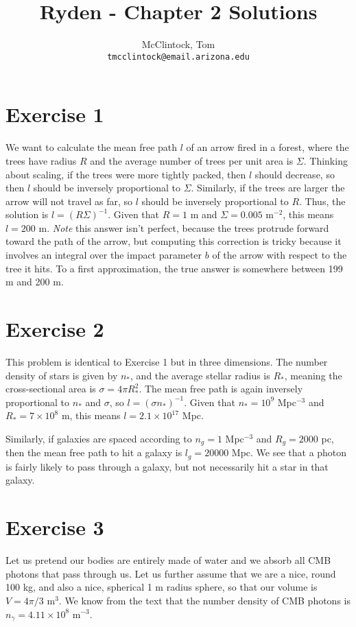 \documentclass[12pt,a4paper]{article}
\author{
  McClintock, Tom\\
  \texttt{tmcclintock@email.arizona.edu}
}
\title{Ryden - Chapter 2 Solutions}
\newcommand\TM[1]{\todo[color=green!40, inline, size=\small]{TM: #1}}
\begin{document}
\maketitle

\section{Exercise 1}
\label{sec:ex1}

We want to calculate the mean free path $l$ of an arrow fired in a forest, where the trees have radius $R$ and the average number of trees per unit area is $\Sigma$. Thinking about scaling, if the trees were more tightly packed, then $l$ should decrease, so then $l$ should be inversely proportional to $\Sigma$. Similarly, if the trees are larger the arrow will not travel as far, so $l$ should be inversely proportional to $R$. Thus, the solution is $l=(R\Sigma)^{-1}$. Given that $R=1$ m and $\Sigma = 0.005$ m$^{-2}$, this means $l=200$ m. {\it Note} this answer isn't perfect, because the trees protrude forward toward the path of the arrow, but computing this correction is tricky because it involves an integral over the impact parameter $b$ of the arrow with respect to the tree it hits. To a first approximation, the true answer is somewhere between 199 m and 200 m.

\section{Exercise 2}
\label{sec:ex2}

This problem is identical to Exercise 1 but in three dimensions. The number density of stars is given by $n_*$, and the average stellar radius is $R_*$, meaning the cross-sectional area is $\sigma = 4\pi R_*^2$. The mean free path is again inversely proportional to $n_*$ and $\sigma$, so $l=(\sigma n_*)^{-1}$. Given that $n_* = 10^9$ Mpc$^{-3}$ and $R_* = 7\times 10^8$ m, this means $l = 2.1\times 10^{17}$ Mpc.

Similarly, if galaxies are spaced according to $n_g= 1$ Mpc$^{-3}$ and $R_g=2000$ pc, then the mean free path to hit a galaxy is $l_g = 20000$ Mpc. We see that a photon is fairly likely to pass through a galaxy, but not necessarily hit a star in that galaxy.

\section{Exercise 3}
\label{sec:ex3}

Let us pretend our bodies are entirely made of water and we absorb all CMB photons that pass through us. Let us further assume that we are a nice, round 100 kg, and also a nice, spherical 1 m radius sphere, so that our volume is $V=4\pi/3$ m$^{3}$. We know from the text that the number density of CMB photons is $n_\gamma = 4.11\times 10^{8}$ m$^{-3}$. \TM{Finish this}
\end{document}
